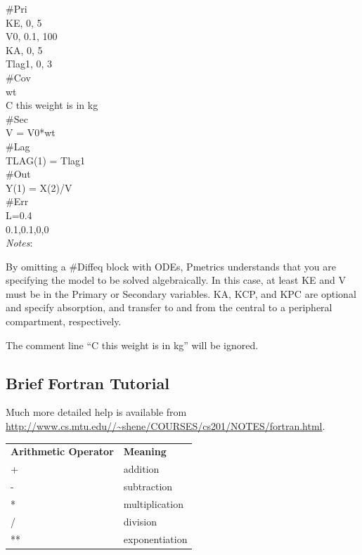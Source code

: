 \documentclass[
]{book}
\begin{document}
\#Pri\\
KE, 0, 5\\
V0, 0.1, 100\\
KA, 0, 5\\
Tlag1, 0, 3\\

\#Cov\\
wt\\
C this weight is in kg\\

\#Sec\\
V = V0*wt\\

\#Lag\\
TLAG(1) = Tlag1\\

\#Out\\
Y(1) = X(2)/V\\

\#Err\\
L=0.4\\
0.1,0.1,0,0\\

\emph{Notes}:

By omitting a \#Diffeq block with ODEs, Pmetrics understands that you
are specifying the model to be solved algebraically. In this case, at
least KE and V must be in the Primary or Secondary variables. KA, KCP,
and KPC are optional and specify absorption, and transfer to and from
the central to a peripheral compartment, respectively.

The comment line ``C this weight is in kg'' will be ignored.

\hypertarget{brief-fortran-tutorial}{%
\subsection{Brief Fortran Tutorial}\label{brief-fortran-tutorial}}

Much more detailed help is available from
\url{http://www.cs.mtu.edu//~shene/COURSES/cs201/NOTES/fortran.html}.

\begin{longtable}[]{@{}ll@{}}
\toprule
\endhead
\textbf{Arithmetic Operator} & \textbf{Meaning} \\
+ & addition \\
- & subtraction \\
* & multiplication \\
/ & division \\
** & exponentiation \\
\bottomrule
\end{longtable}
\end{document}
